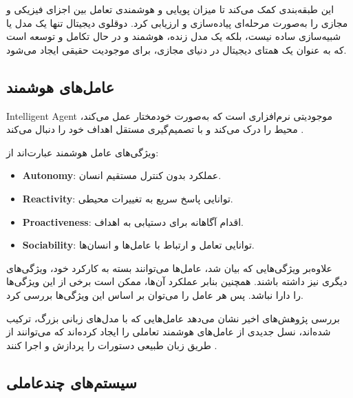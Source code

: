  
این طبقه‌بندی کمک می‌کند تا میزان پویایی و هوشمندی تعامل بین اجزای فیزیکی و مجازی را به‌صورت مرحله‌ای پیاده‌سازی و ارزیابی کرد. دوقلوی دیجیتال تنها یک مدل یا شبیه‌سازی ساده نیست، بلکه یک مدل زنده،‌ هوشمند و در حال تکامل و توسعه است که به عنوان یک همتای دیجیتال در دنیای مجازی، برای موجودیت حقیقی ایجاد می‌شود.




\subsection{عامل‌های هوشمند}

\gls{Intelligent Agent} موجودیتی نرم‌افزاری است که به‌صورت خودمختار عمل می‌کند، محیط را درک می‌کند و با تصمیم‌گیری مستقل اهداف خود را دنبال می‌کند \cite{wooldridge2009introduction}. 

ویژگی‌های عامل هوشمند عبارت‌اند از:
\begin{itemize}
	 \item \textbf{\gls{Autonomy}}: عملکرد بدون کنترل مستقیم انسان.
	\item \textbf{\gls{Reactivity}}: توانایی پاسخ سریع به تغییرات محیطی.
	\item \textbf{\gls{Proactiveness}}: اقدام آگاهانه برای دستیابی به اهداف.
	\item \textbf{\gls{Sociability}}: توانایی تعامل و ارتباط با عامل‌ها و انسان‌ها.
\end{itemize}

علاوه‌بر ویژگی‌هایی که بیان شد، عامل‌ها می‌توانند بسته به کارکرد خود، ویژگی‌های دیگری نیز داشته باشند. همچنین بنابر عملکرد آن‌ها، ممکن است برخی از این ویژگی‌ها را دارا نباشد. پس هر عامل را می‌توان بر اساس این ویژگی‌ها بررسی کرد.

بررسی پژوهش‌های اخیر نشان می‌دهد عامل‌هایی که با مدل‌های زبانی بزرگ، ترکیب شده‌اند، نسل جدیدی از عامل‌های هوشمند تعاملی را ایجاد کرده‌اند که می‌توانند از طریق زبان طبیعی دستورات را پردازش و اجرا کنند \cite{park2025interactive}.


\subsection{سیستم‌های چندعاملی}

